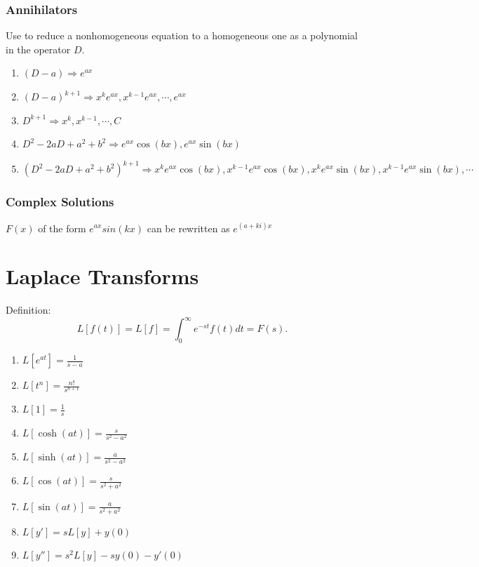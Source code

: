 \documentclass[a4paper,10pt]{report}
\begin{document}
\subsection{Annihilators}
Use to reduce a nonhomogeneous equation to a homogeneous one as a polynomial in the operator $D$.
\begin{enumerate}
	\item $(D-a) \Rightarrow e^{ax}$
	\item $(D-a)^{k+1} \Rightarrow x^k e^{ax}, x^{k-1}e^{ax}, \cdots, e^{ax}$
	\item $D^{k+1} \Rightarrow x^k, x^{k-1}, \cdots,C$
	\item $D^2-2aD+a^2+b^2 \Rightarrow e^{ax}\cos(bx), e^{ax}\sin(bx)$
	\item $(D^2-2aD+a^2+b^2)^{k+1} \Rightarrow x^k e^{ax}\cos(bx), x^{k-1} e^{ax}\cos(bx), x^k e^{ax}\sin(bx), x^{k-1}e^{ax}\sin(bx),\cdots$
\end{enumerate}

\subsection{Complex Solutions}
$F(x)$ of the form $e^{ax}sin(kx)$ can be rewritten as $e^{(a+ki)x}$


\chapter{Laplace Transforms}

Definition:
\begin{equation}
	L[f(t)] = L[f] =\int_0^\infty e^{-st}f(t)dt = F(s).
\end{equation}

\begin{enumerate}
	\item $L[e^{at}] = \frac{1}{s-a}$
	\item $L[t^n] = \frac{n!}{s^{n+1}}$
	\item $L[1] = \frac{1}{s}$
	\item $L[\cosh(at)] = \frac{s}{s^2-a^2}$
	\item $L[\sinh(at)] = \frac{a}{s^2-a^2}$
	\item $L[\cos(at)]= \frac{s}{s^2+a^2}$
	\item $L[\sin(at)]= \frac{a}{s^2+a^2}$
	\item $L[y'] = sL[y] + y(0)$
	\item $L[y''] = s^2L[y] - sy(0) - y'(0)$
\end{enumerate}
\end{document}
